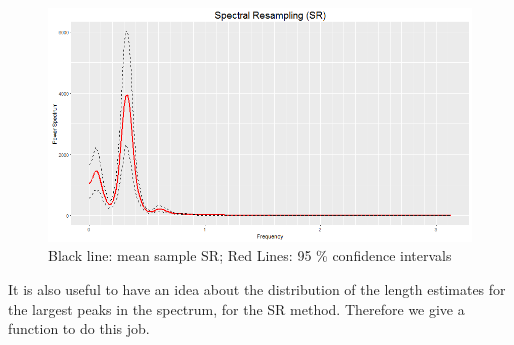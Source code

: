 \documentclass{article}\usepackage[]{graphicx}\usepackage[]{color}
\begin{document}
\begin{figure}[htbp]
\centering
\includegraphics[scale = 0.4]{Plots/SR.png}
\caption{Black line: mean sample SR; Red Lines: 95 \% confidence intervals}
\label{fig:SR.ci}
\end{figure}

It is also useful to have an idea about the distribution of the length estimates for the largest peaks in the spectrum, for the SR method. Therefore we give a function to do this job.
\end{document}
